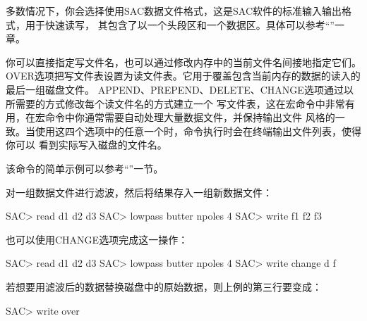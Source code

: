多数情况下，你会选择使用SAC数据文件格式，这是SAC软件的标准输入输出格式，用于快速读写，
其包含了以一个头段区和一个数据区。具体可以参考``''一章。

你可以直接指定写文件名，也可以通过修改内存中的当前文件名间接地指定它们。
OVER选项把写文件表设置为读文件表。它用于覆盖包含当前内存的数据的读入的最后一组磁盘文件。
APPEND、PREPEND、DELETE、CHANGE选项通过以所需要的方式修改每个读文件名的方式建立一个
写文件表，这在宏命令中非常有用，在宏命令中你通常需要自动处理大量数据文件，并保持输出文件
风格的一致。当使用这四个选项中的任意一个时，命令执行时会在终端输出文件列表，使得你可以
看到实际写入磁盘的文件名。

该命令的简单示例可以参考``''一节。

对一组数据文件进行滤波，然后将结果存入一组新数据文件：
\begin{SACCode}
SAC> read d1 d2 d3
SAC> lowpass butter npoles 4
SAC> write f1 f2 f3
\end{SACCode}

也可以使用CHANGE选项完成这一操作：
\begin{SACCode}
SAC> read d1 d2 d3
SAC> lowpass butter npoles 4
SAC> write change d f
\end{SACCode}

若想要用滤波后的数据替换磁盘中的原始数据，则上例的第三行要变成：
\begin{SACCode}
SAC> write over
\end{SACCode}
